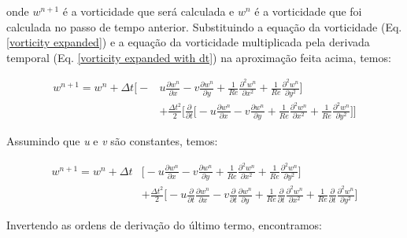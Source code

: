 \noindent
onde $w^{n+1}$ é a vorticidade que será calculada
e $w^{n}$ é a vorticidade que foi calculada no passo de tempo anterior.
Substituindo a equação da vorticidade (Eq. \ref{vorticity expanded})
e a equação da vorticidade multiplicada pela derivada temporal
(Eq. \ref{vorticity expanded with dt}) na aproximação feita acima, temos:

\begin{equation}
\begin{aligned}
 w^{n+1} = w^{n} 
         + \Delta t 
         \Bigg[
         - & u \frac{\partial w^{n}}{\partial x}
         - v \frac{\partial w^{n}}{\partial y}
         + \frac{1}{Re} \frac{\partial^2 w^{n}}{\partial x^2} 
         + \frac{1}{Re} \frac{\partial^2 w^{n}}{\partial y^2} 
         \Bigg]
         \\[5pt]
         & + \frac{\Delta t^2}{2}
         \Bigg[
         \frac{\partial }{\partial t}
         \Bigg[ 
         - u \frac{\partial w^{n}}{\partial x}
         - v \frac{\partial w^{n}}{\partial y}
         + \frac{1}{Re} \frac{\partial^2 w^{n}}{\partial x^2} 
         + \frac{1}{Re} \frac{\partial^2 w^{n}}{\partial y^2} 
         \Bigg]
         \Bigg]
\end{aligned}
\end{equation}

\noindent
Assumindo que \textit{u} e \textit{v} são constantes, temos:

\begin{equation}
\begin{aligned}
 w^{n+1} = w^{n} 
         + \Delta t &
           \Bigg[
         - u \frac{\partial w^{n}}{\partial x}
         - v \frac{\partial w^{n}}{\partial y}
         + \frac{1}{Re} \frac{\partial^2 w^{n}}{\partial x^2} 
         + \frac{1}{Re} \frac{\partial^2 w^{n}}{\partial y^2} 
         \Bigg]
         \\[5pt]
         & + \frac{\Delta t^2}{2}
         \Bigg[
         - u
         \frac{\partial }{\partial t}
         \frac{\partial w^{n}}{\partial x}
         - v
         \frac{\partial }{\partial t}
         \frac{\partial w^{n}}{\partial y}
         + \frac{1}{Re} \frac{\partial }{\partial t}
         \frac{\partial^2 w^{n}}{\partial x^2} 
         + \frac{1}{Re} \frac{\partial }{\partial t}
         \frac{\partial^2 w^{n}}{\partial y^2} 
         \Bigg]
\end{aligned}
\end{equation}

\noindent
Invertendo as ordens de derivação do último termo, encontramos:

